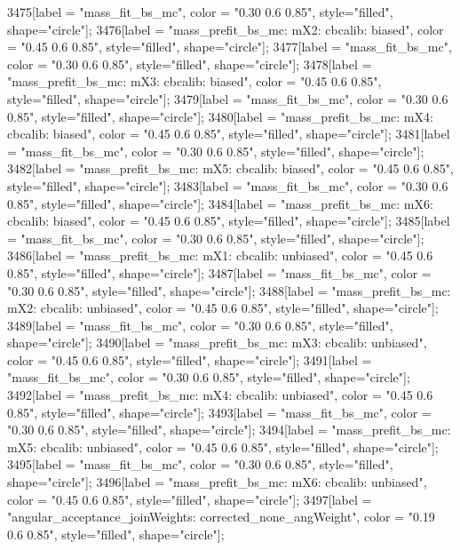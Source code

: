 {	3475[label = "mass_fit_bs_mc", color = "0.30 0.6 0.85", style="filled", shape="circle"];
	3476[label = "mass_prefit_bs_mc\nmassbin: mX2\nmassmodel: cbcalib\ntrigger: biased", color = "0.45 0.6 0.85", style="filled", shape="circle"];
	3477[label = "mass_fit_bs_mc", color = "0.30 0.6 0.85", style="filled", shape="circle"];
	3478[label = "mass_prefit_bs_mc\nmassbin: mX3\nmassmodel: cbcalib\ntrigger: biased", color = "0.45 0.6 0.85", style="filled", shape="circle"];
	3479[label = "mass_fit_bs_mc", color = "0.30 0.6 0.85", style="filled", shape="circle"];
	3480[label = "mass_prefit_bs_mc\nmassbin: mX4\nmassmodel: cbcalib\ntrigger: biased", color = "0.45 0.6 0.85", style="filled", shape="circle"];
	3481[label = "mass_fit_bs_mc", color = "0.30 0.6 0.85", style="filled", shape="circle"];
	3482[label = "mass_prefit_bs_mc\nmassbin: mX5\nmassmodel: cbcalib\ntrigger: biased", color = "0.45 0.6 0.85", style="filled", shape="circle"];
	3483[label = "mass_fit_bs_mc", color = "0.30 0.6 0.85", style="filled", shape="circle"];
	3484[label = "mass_prefit_bs_mc\nmassbin: mX6\nmassmodel: cbcalib\ntrigger: biased", color = "0.45 0.6 0.85", style="filled", shape="circle"];
	3485[label = "mass_fit_bs_mc", color = "0.30 0.6 0.85", style="filled", shape="circle"];
	3486[label = "mass_prefit_bs_mc\nmassbin: mX1\nmassmodel: cbcalib\ntrigger: unbiased", color = "0.45 0.6 0.85", style="filled", shape="circle"];
	3487[label = "mass_fit_bs_mc", color = "0.30 0.6 0.85", style="filled", shape="circle"];
	3488[label = "mass_prefit_bs_mc\nmassbin: mX2\nmassmodel: cbcalib\ntrigger: unbiased", color = "0.45 0.6 0.85", style="filled", shape="circle"];
	3489[label = "mass_fit_bs_mc", color = "0.30 0.6 0.85", style="filled", shape="circle"];
	3490[label = "mass_prefit_bs_mc\nmassbin: mX3\nmassmodel: cbcalib\ntrigger: unbiased", color = "0.45 0.6 0.85", style="filled", shape="circle"];
	3491[label = "mass_fit_bs_mc", color = "0.30 0.6 0.85", style="filled", shape="circle"];
	3492[label = "mass_prefit_bs_mc\nmassbin: mX4\nmassmodel: cbcalib\ntrigger: unbiased", color = "0.45 0.6 0.85", style="filled", shape="circle"];
	3493[label = "mass_fit_bs_mc", color = "0.30 0.6 0.85", style="filled", shape="circle"];
	3494[label = "mass_prefit_bs_mc\nmassbin: mX5\nmassmodel: cbcalib\ntrigger: unbiased", color = "0.45 0.6 0.85", style="filled", shape="circle"];
	3495[label = "mass_fit_bs_mc", color = "0.30 0.6 0.85", style="filled", shape="circle"];
	3496[label = "mass_prefit_bs_mc\nmassbin: mX6\nmassmodel: cbcalib\ntrigger: unbiased", color = "0.45 0.6 0.85", style="filled", shape="circle"];
	3497[label = "angular_acceptance_joinWeights\nwflag: corrected_none_angWeight", color = "0.19 0.6 0.85", style="filled", shape="circle"];
}
